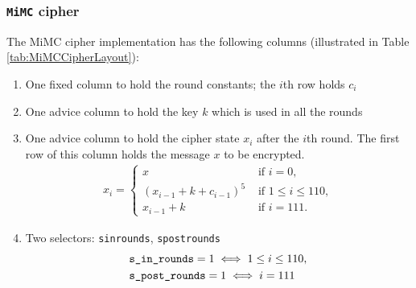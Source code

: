 \documentclass[10pt]{article}
\begin{document}
\subsubsection{\texttt{MiMC} cipher}
The MiMC cipher implementation has the following columns (illustrated in Table \ref{tab:MiMCCipherLayout}):
\begin{enumerate}
  \item One fixed column to hold the round constants; the $i$th row holds $c_i$
  \item One advice column to hold the key $k$ which is used in all the rounds
  \item One advice column to hold the cipher state $x_i$ after the $i$th round. The first row of this column holds the message $x$ to be encrypted.
    \begin{align*}
      x_i = 
      \begin{cases}
        x & \text{ if } i = 0,\\
        (x_{i-1} + k + c_{i-1})^5 & \text{ if } 1 \le i \le  110,\\
        x_{i-1} + k & \text{ if } i=111.
      \end{cases}
    \end{align*}
  \item Two selectors: \texttt{s\textunderscore in\textunderscore rounds}, \texttt{s\textunderscore post\textunderscore rounds}
    \begin{align*}
      & \texttt{s\textunderscore in\textunderscore rounds} = 1  \iff 1 \le i\le 110,\\
      & \texttt{s\textunderscore post\textunderscore rounds} = 1  \iff i=111
    \end{align*}
\end{enumerate}

\begin{table}[t]
  \centering
  \caption{\texttt{MiMC} cipher layout}
  \label{tab:MiMCCipherLayout}
\end{table}
\end{document}
